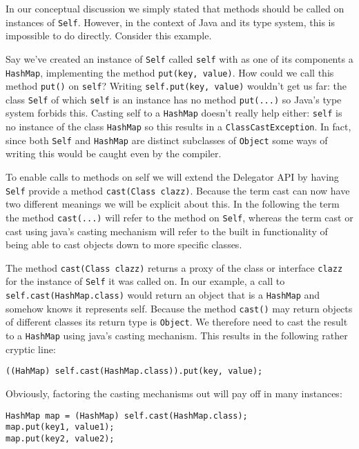 \documentclass[a4paper,12pt]{book}
\begin{document}
In our conceptual discussion we simply stated that methods should be called on instances of \verb|Self|. However, in the context of Java and its type system, this is impossible to do directly. Consider this example.

Say we've created an instance of \verb|Self| called \verb|self| with as one of its components a \verb|HashMap|, implementing the method \verb|put(key, value)|. How could we call this method \verb|put()| on \verb|self|? Writing \verb|self.put(key, value)| wouldn't get us far: the class \verb|Self| of which \verb|self| is an instance has no method \verb|put(...)| so Java's type system forbids this. Casting self to a \verb|HashMap| doesn't really help either: \verb|self| is no instance of the class \verb|HashMap| so this results in a \verb|ClassCastException|. In fact, since both \verb|Self| and \verb|HashMap| are distinct subclasses of \verb|Object| some ways of writing this would be caught even by the compiler.

To enable calls to methods on self we will extend the Delegator API by having \verb|Self| provide a method \verb|cast(Class clazz)|. Because the term cast can now have two different meanings we will be explicit about this. In the following the term the method \verb|cast(...)| will refer to the method on \verb|Self|, whereas the term cast or cast using java's casting mechanism will refer to the built in functionality of being able to cast objects down to more specific classes.

The method \verb|cast(Class clazz)| returns a proxy of the class or interface \verb|clazz| for the instance of \verb|Self| it was called on. In our example, a call to \verb|self.cast(HashMap.class)| would return an object that is a \verb|HashMap| and somehow knows it represents self. Because the method \verb|cast()| may return objects of different classes its return type is \verb|Object|. We therefore need to cast the result to a \verb|HashMap| using java's casting mechanism. This results in the following rather cryptic line:

\begin{verbatim}
((HahMap) self.cast(HashMap.class)).put(key, value);
\end{verbatim}

Obviously, factoring the casting mechanisms out will pay off in many instances:

\begin{verbatim}
HashMap map = (HashMap) self.cast(HashMap.class);
map.put(key1, value1);
map.put(key2, value2);
\end{verbatim}
\end{document}
